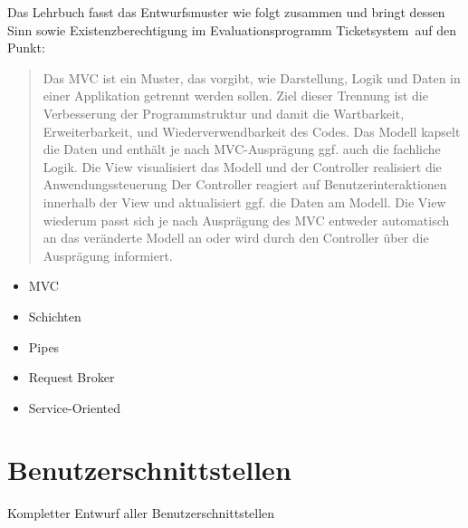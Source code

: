 Das Lehrbuch fasst das Entwurfsmuster wie folgt zusammen und bringt dessen Sinn sowie Existenzberechtigung im Evaluationsprogramm \glqq Ticketsystem\grqq\ auf den Punkt:
\blockcquote[2015]{JavaEE ABC}{
	Das MVC ist ein Muster, das vorgibt, wie Darstellung, Logik und Daten in einer Applikation getrennt werden sollen. Ziel dieser Trennung ist die Verbesserung der Programmstruktur und damit die Wartbarkeit, Erweiterbarkeit, und Wiederverwendbarkeit des Codes.
	Das Modell kapselt die Daten und enthält je nach MVC-Ausprägung ggf. auch die fachliche Logik. Die View visualisiert das Modell und der Controller realisiert die Anwendungssteuerung Der Controller reagiert auf Benutzerinteraktionen innerhalb der View und aktualisiert ggf. die Daten am Modell. Die View wiederum passt sich je nach Ausprägung des MVC entweder automatisch an das veränderte Modell an oder wird durch den Controller über die Ausprägung informiert.
}

\begin{itemize}
	\item MVC
	\item Schichten
	\item Pipes
	\item Request Broker
	\item Service-Oriented
\end{itemize}

\section{Benutzerschnittstellen} 
Kompletter Entwurf aller Benutzerschnittstellen
